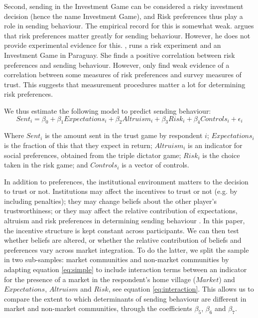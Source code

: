 Second, sending in the Investment Game can be considered a risky investment decision (hence the name Investment Game), and Risk preferences thus play a role in sending behaviour. The empirical record for this is somewhat weak. \cite{Karlan2005} argues that risk preferences matter greatly for sending behaviour. However, he does not provide experimental evidence for this. \cite{Schechter2007}, runs a risk experiment and an Investment Game in Paraguay. She finds a positive correlation between risk preferences and sending behaviour. However,  \cite{Eckel2004} only find weak evidence of a correlation between some measures of risk preferences and survey measures of trust. This suggests that measurement procedures matter a lot for determining risk preferences.

We thus estimate the following model to predict sending behaviour:
\begin{equation}
\label{eq:simple}
Sent_i = \beta_0 + \beta_1 Expectations_i + \beta_2 Altruism_i + \beta_3 Risk_i + \beta_4 Controls_i + \epsilon_i 
\end{equation} 

Where $Sent_i$ is the amount sent in the trust game by respondent $i$; $Expectations_i$ is the fraction of this that they expect in return;  $Altruism_i$ is an indicator for social preferences, obtained from the triple dictator game; $Risk_i$ is the choice taken in the risk game; and $Controls_i$ is a vector of controls.

In addition to preferences, the institutional environment matters to the decision to trust or not. Institutions may affect the incentives to trust or not (e.g. by including penalties); they may change beliefs about the other player's trustworthiness; or they may affect the relative contribution of expectations, altruism and risk preferences in determining sending behaviour \citep{Bohnet2007}. In this paper, the incentive structure is kept constant across participants. We can then test whether beliefs are altered, or whether the relative contribution of beliefs and preferences vary across market integration. To do the latter, we split the sample in two sub-samples: market communities and non-market communities by adapting equation \ref{eq:simple} to include interaction terms between an indicator for the presence of a market in the respondent's home village ($Market$) and $Expectations$, $Altruism$ and $Risk$, see equation \ref{eq:interaction}. This allows us to compare the extent to which determinants of sending behaviour are different in market and non-market communities, through the coefficients $\beta_5$, $\beta_6$ and $\beta_7$.

